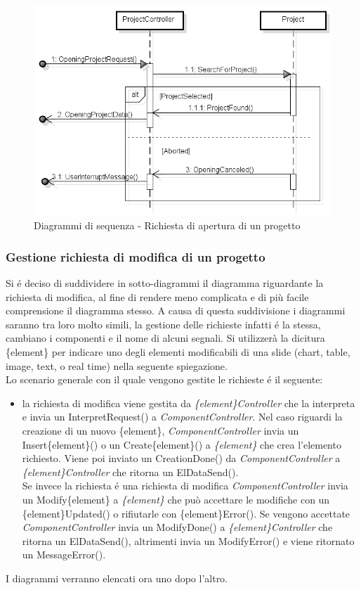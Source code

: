 \begin{figure}[H]
	\centering
	\includegraphics[scale=0.5]{img/open.png}
	\caption{Diagrammi di sequenza - Richiesta di apertura di un progetto}
\end{figure}

\newpage

\subsubsection{Gestione richiesta di modifica di un progetto}
Si é deciso di suddividere in sotto-diagrammi il diagramma riguardante la richiesta di modifica, al fine di rendere meno complicata e di più facile comprensione il diagramma stesso. A causa di questa suddivisione i diagrammi saranno tra loro molto simili, la gestione delle richieste infatti é la stessa, cambiano i componenti e il nome di alcuni segnali. Si utilizzerà la dicitura \{element\} per indicare uno degli elementi modificabili di una slide (chart, table, image, text, o real time) nella seguente spiegazione. 
\\Lo scenario generale con il quale vengono gestite le richieste é il seguente:
\begin{itemize}
	\item[]la richiesta di modifica viene gestita da \textit{\{element\}Controller} che la interpreta e invia un InterpretRequest() a \textit{ComponentController}. Nel caso riguardi la creazione di un nuovo \{element\}, \textit{ComponentController} invia un Insert\{element\}() o un Create\{element\}() a \textit{\{element\}} che crea l'elemento richiesto. Viene poi inviato un CreationDone() da \textit{ComponentController} a \textit{\{element\}Controller} che ritorna un ElDataSend().\\
	Se invece la richiesta é una richiesta di modifica \textit{ComponentController} invia un Modify\{element\} a \textit{\{element\}} che può accettare le modifiche con un \{element\}Updated() o rifiutarle con \{element\}Error(). Se vengono accettate \textit{ComponentController} invia un ModifyDone() a \textit{\{element\}Controller} che ritorna un ElDataSend(), altrimenti invia un ModifyError() e viene ritornato un MessageError().
\end{itemize}
I diagrammi verranno elencati ora uno dopo l'altro.
\newpage

